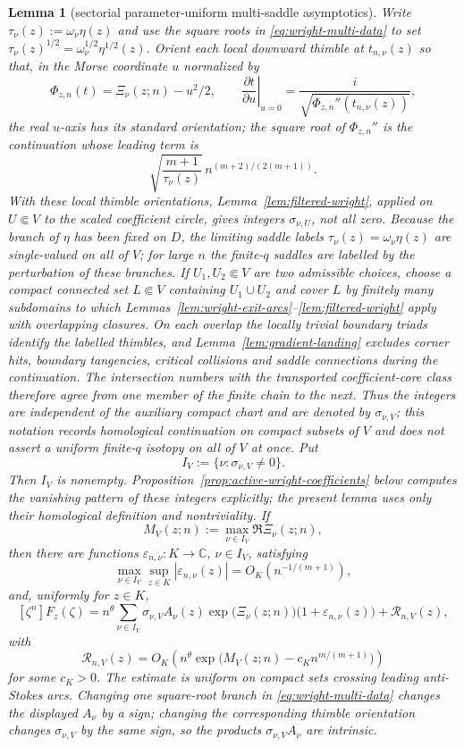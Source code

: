 \documentclass[10pt,a4paper]{amsart}
\newtheorem{lem}{Lemma}
\newcommand{\C}{\mathbb C}
\begin{document}
\begin{lem}[sectorial parameter-uniform multi-saddle asymptotics]
Write $\tau_\nu(z):=\omega_\nu\eta(z)$ and use the square roots in \eqref{eq:wright-multi-data} to set $\tau_\nu(z)^{1/2}=\omega_\nu^{1/2}\eta^{1/2}(z)$. Orient each local downward thimble at $t_{n,\nu}(z)$ so that, in the Morse coordinate $u$ normalized by
$$\Phi_{z,n}(t)=\Xi_\nu(z;n)-u^2/2,
\qquad
\left.\frac{\partial t}{\partial u}\right|_{u=0}=\frac{i}{\sqrt{\Phi_{z,n}''(t_{n,\nu}(z))}},$$
the real $u$-axis has its standard orientation; the square root of $\Phi_{z,n}''$ is the continuation whose leading term is
$$\sqrt{\frac{m+1}{\tau_\nu(z)}}\,n^{(m+2)/(2(m+1))}.$$
With these local thimble orientations, Lemma~\ref{lem:filtered-wright}, applied on $U\Subset V$ to the scaled coefficient circle, gives integers $\sigma_{\nu,U}$, not all zero. Because the branch of $\eta$ has been fixed on $D$, the limiting saddle labels $\tau_\nu(z)=\omega_\nu\eta(z)$ are single-valued on all of $V$; for large $n$ the finite-$q$ saddles are labelled by the perturbation of these branches. If $U_1,U_2\Subset V$ are two admissible choices, choose a compact connected set $L\Subset V$ containing $U_1\cup U_2$ and cover $L$ by finitely many subdomains to which Lemmas~\ref{lem:wright-exit-arcs}--\ref{lem:filtered-wright} apply with overlapping closures. On each overlap the locally trivial boundary triads identify the labelled thimbles, and Lemma~\ref{lem:gradient-landing} excludes corner hits, boundary tangencies, critical collisions and saddle connections during the continuation. The intersection numbers with the transported coefficient-core class therefore agree from one member of the finite chain to the next. Thus the integers are independent of the auxiliary compact chart and are denoted by $\sigma_{\nu,V}$; this notation records homological continuation on compact subsets of $V$ and does not assert a uniform finite-$q$ isotopy on all of $V$ at once. Put
$$I_V:=\{\nu:\sigma_{\nu,V}\ne0\}.$$
Then $I_V$ is nonempty. Proposition~\ref{prop:active-wright-coefficients} below computes the vanishing pattern of these integers explicitly; the present lemma uses only their homological definition and nontriviality. If
$$M_V(z;n):=\max_{\nu\in I_V}\Re\Xi_\nu(z;n),$$
then there are functions $\varepsilon_{n,\nu}:K\to\C$, $\nu\in I_V$, satisfying
$$\max_{\nu\in I_V}\sup_{z\in K}|\varepsilon_{n,\nu}(z)|=O_K\!\left(n^{-1/(m+1)}\right),$$
and, uniformly for $z\in K$,
\begin{equation}\label{eq:wright-multi}
[\zeta^n]F_z(\zeta)
=
n^\theta\sum_{\nu\in I_V}\sigma_{\nu,V}A_\nu(z)\exp\!\bigl(\Xi_\nu(z;n)\bigr)\bigl(1+\varepsilon_{n,\nu}(z)\bigr)
+\mathcal R_{n,V}(z),
\end{equation}
with
\begin{equation}\label{eq:wright-multi-rem}
\mathcal R_{n,V}(z)=
O_K\!\left(
n^\theta
\exp\!\bigl(M_V(z;n)-c_K n^{m/(m+1)}\bigr)
\right)
\end{equation}
for some $c_K>0$. The estimate is uniform on compact sets crossing leading anti-Stokes arcs. Changing one square-root branch in \eqref{eq:wright-multi-data} changes the displayed $A_\nu$ by a sign; changing the corresponding thimble orientation changes $\sigma_{\nu,V}$ by the same sign, so the products $\sigma_{\nu,V}A_\nu$ are intrinsic.
\end{lem}
\end{document}
